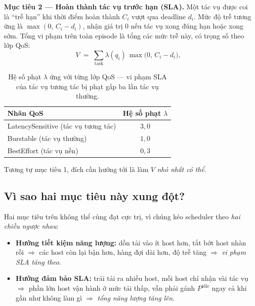 \textbf{Mục tiêu 2 --- Hoàn thành tác vụ trước hạn (SLA).} Một tác vụ
được coi là ``trễ hạn'' khi thời điểm hoàn thành $C_i$ vượt qua deadline
$d_i$. Mức độ trễ tương ứng là $\max(0,\, C_i - d_i)$, nhận giá trị $0$
nếu tác vụ xong đúng hạn hoặc xong sớm. Tổng vi phạm trên toàn episode là
tổng các mức trễ này, có trọng số theo lớp QoS:
\begin{equation}
  V \;=\; \sum_{\text{task}} \lambda(q_i)\,\max\!\big(0,\, C_i - d_i\big),
  \label{eq:sla-violation}
\end{equation}
\begin{table}[H]
  \centering
  \footnotesize
  \begin{tabular}{lc}
    \toprule
    \textbf{Nhãn QoS} & \textbf{Hệ số phạt $\lambda$} \\
    \midrule
    LatencySensitive (tác vụ tương tác) & $3{,}0$ \\
    Burstable (tác vụ thường) & $1{,}0$ \\
    BestEffort (tác vụ nền) & $0{,}3$ \\
    \bottomrule
  \end{tabular}
  \caption{Hệ số phạt $\lambda$ ứng với từng lớp QoS --- vi phạm SLA
  của tác vụ tương tác bị phạt gấp ba lần tác vụ thường.}
  \label{tab:lambda-qos}
\end{table}

Tương tự mục tiêu 1, đích cần hướng tới là làm $V$ \emph{nhỏ nhất có thể}.

\subsection{Vì sao hai mục tiêu này xung đột?}
\label{ssec:tradeoff}

Hai mục tiêu trên không thể cùng đạt cực trị, vì chúng kéo scheduler theo
\emph{hai chiều ngược nhau}:

\begin{itemize}
  \item \textbf{Hướng tiết kiệm năng lượng:} dồn tải vào ít host hơn, tắt
        bớt host nhàn rỗi $\Rightarrow$ các host còn lại bận hơn, hàng đợi
        dài hơn, độ trễ tăng $\Rightarrow$ \emph{vi phạm SLA tăng theo}.
  \item \textbf{Hướng đảm bảo SLA:} trải tải ra nhiều host, mỗi host chỉ
        nhận vài tác vụ $\Rightarrow$ phần lớn host vận hành ở mức tải
        thấp, vẫn phải gánh $P^{\mathrm{idle}}$ ngay cả khi gần như không
        làm gì $\Rightarrow$ \emph{tổng năng lượng tăng lên}.
\end{itemize}

